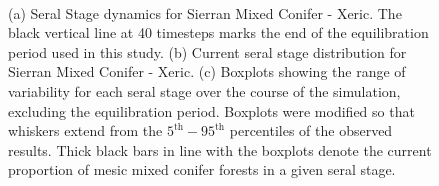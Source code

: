 \begin{figure}[!htbp]
  \centering
  \\
  \caption{(a) Seral Stage dynamics for Sierran Mixed Conifer - Xeric. The black vertical line at 40 timesteps marks the end of the equilibration period used in this study. (b) Current seral stage distribution for Sierran Mixed Conifer - Xeric. (c) Boxplots showing the range of variability for each seral stage over the course of the simulation, excluding the equilibration period. Boxplots were modified so that whiskers extend from the $5^{\text{th}} - 95^{\text{th}}$ percentiles of the observed results. Thick black bars in line with the boxplots denote the current proportion of mesic mixed conifer forests in a given seral stage.} 
  \label{fig:covcond_smcx_app}
\end{figure}

\clearpage


